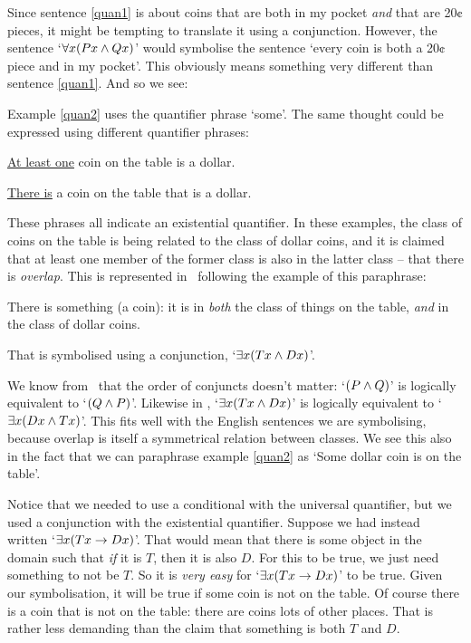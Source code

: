 Since sentence \ref{quan1} is about coins that are both in my pocket \emph{and} that are 20¢ pieces, it might be tempting to translate it using a conjunction. However, the sentence `$\forall x(Px \wedge Qx)$' would symbolise the sentence `every coin is both a 20¢ piece and in my pocket'. This obviously means something very different than sentence \ref{quan1}. And so we see:


Example \ref{quan2} uses the quantifier phrase `some'. The same thought could be expressed using different quantifier phrases: \begin{earg}
	\item[\ex{quan2a}] \underline{At least one} coin on the table is a dollar.
	\item[\ex{quan2b}] \underline{There is} a coin on the table that is a dollar.
\end{earg} These phrases all indicate an existential quantifier. In these examples, the class of coins on the table is being related to the class of dollar coins, and it is claimed that at least one member of the former class is also in the latter class – that there is \emph{overlap}. This is represented in \FOL\ following the example of this paraphrase:
\begin{earg}
	\item[\ex{coindol}] There is something (a coin): it is in \emph{both} the class of things on the table, \emph{and} in the class of dollar coins.
\end{earg} That is symbolised using a conjunction, `$\exists x (Tx \wedge Dx)$'. 

We know from \TFL\ that the order of conjuncts doesn't matter: `$(P \wedge Q)$' is logically equivalent to `$(Q\wedge P)$'. Likewise in \FOL, `$\exists x (Tx \wedge Dx)$' is logically equivalent to `$\exists x (Dx \wedge Tx)$'. This fits well with the English sentences we are symbolising, because overlap is itself a symmetrical relation between classes. We see this also in the fact that we can paraphrase example \ref{quan2} as `Some dollar coin is on the table'.

Notice that we needed to use a conditional with the universal quantifier, but we used a conjunction with the existential quantifier. Suppose we had instead written `$\exists x(Tx \rightarrow Dx)$'. That would mean that there is some object in the domain such that  \emph{if} it is $T$, then it is also $D$. For this to be true, we just need something to not be $T$. So it is \emph{very easy} for `$\exists x(Tx \rightarrow Dx)$' to be true. Given our symbolisation, it will be true if some coin is not on the table. Of course there is a coin that is not on the table: there are coins lots of other places.  That is rather less demanding than the claim that something is both $T$ and $D$.

